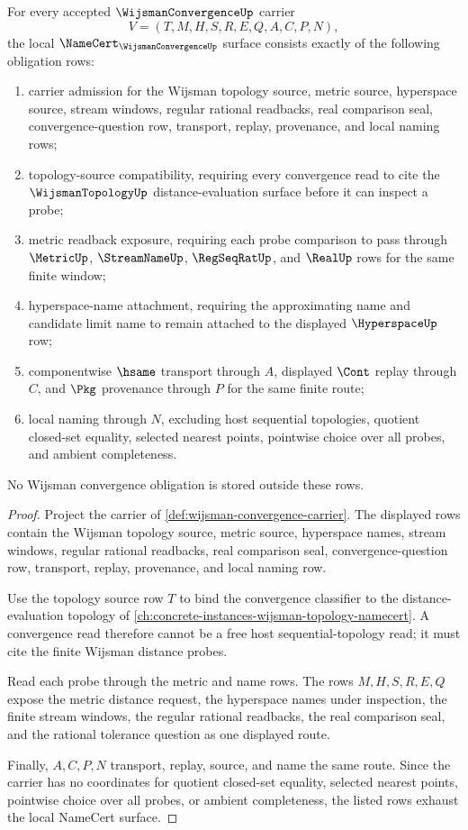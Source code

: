 \begin{theorem}
\label{thm:wijsman-convergence-namecert-obligations}
For every accepted $\WijsmanConvergenceUp$ carrier
$$
V=(T,M,H,S,R,E,Q,A,C,P,N),
$$
the local $\NameCert_{\WijsmanConvergenceUp}$ surface consists exactly of the following obligation rows:
\begin{enumerate}
\item carrier admission for the Wijsman topology source, metric source, hyperspace source, stream windows, regular rational readbacks, real comparison seal, convergence-question row, transport, replay, provenance, and local naming rows;
\item topology-source compatibility, requiring every convergence read to cite the $\WijsmanTopologyUp$ distance-evaluation surface before it can inspect a probe;
\item metric readback exposure, requiring each probe comparison to pass through $\MetricUp$, $\StreamNameUp$, $\RegSeqRatUp$, and $\RealUp$ rows for the same finite window;
\item hyperspace-name attachment, requiring the approximating name and candidate limit name to remain attached to the displayed $\HyperspaceUp$ row;
\item componentwise $\hsame$ transport through $A$, displayed $\Cont$ replay through $C$, and $\Pkg$ provenance through $P$ for the same finite route;
\item local naming through $N$, excluding host sequential topologies, quotient closed-set equality, selected nearest points, pointwise choice over all probes, and ambient completeness.
\end{enumerate}
No Wijsman convergence obligation is stored outside these rows.
\end{theorem}
\begin{proof}
Project the carrier of \autoref{def:wijsman-convergence-carrier}. The displayed rows contain the Wijsman topology source, metric source, hyperspace names, stream windows, regular rational readbacks, real comparison seal, convergence-question row, transport, replay, provenance, and local naming row.

Use the topology source row $T$ to bind the convergence classifier to the distance-evaluation topology of \autoref{ch:concrete-instances-wijsman-topology-namecert}. A convergence read therefore cannot be a free host sequential-topology read; it must cite the finite Wijsman distance probes.

Read each probe through the metric and name rows. The rows $M,H,S,R,E,Q$ expose the metric distance request, the hyperspace names under inspection, the finite stream windows, the regular rational readbacks, the real comparison seal, and the rational tolerance question as one displayed route.

Finally, $A,C,P,N$ transport, replay, source, and name the same route. Since the carrier has no coordinates for quotient closed-set equality, selected nearest points, pointwise choice over all probes, or ambient completeness, the listed rows exhaust the local NameCert surface.
\end{proof}

